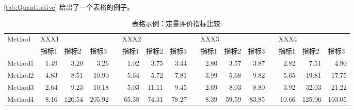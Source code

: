 \documentclass[a4paper,zihao=-4]{article}
\begin{document}
\cref{tab:Quantitative} 给出了一个表格的例子。

\begin{table}[htb!]
	\centering
	\setlength{\tabcolsep}{2pt}
	\scriptsize
	\caption{表格示例：定量评价指标比较.}
	\begin{tabular}{lrrrrrrrrrrrrrrr}
		\toprule
		Method & \multicolumn{3}{l}{XXX1} & & \multicolumn{3}{l}{XXX2} & & \multicolumn{3}{l}{XXX3} & & \multicolumn{3}{l}{XXX4} \\
		\cmidrule{2-4} \cmidrule{6-8} \cmidrule{10-12} \cmidrule{14-16}
		        & \multicolumn{1}{l}{指标1} & \multicolumn{1}{l}{指标2} & \multicolumn{1}{l}{指标3} &           & \multicolumn{1}{l}{指标1} & \multicolumn{1}{l}{指标2} & \multicolumn{1}{l}{指标3} &           & \multicolumn{1}{l}{指标1} & \multicolumn{1}{l}{指标2} & \multicolumn{1}{l}{指标3} &           & \multicolumn{1}{l}{指标1} & \multicolumn{1}{l}{指标2} & \multicolumn{1}{l}{指标3} \\
		\midrule
		Method1 & 1.49                        & 3.20                        & 3.26                        &           & 1.02                        & 3.75                        & 3.44                        &           & 2.80                        & 3.57                        & 3.87                        &           & 2.82                        & 7.51                        & 4.90                        \\
		Method2 & 4.83                        & 8.51                        & 10.90                       &           & 5.64                        & 5.72                        & 7.81                        &           & 3.99                        & 5.68                        & 9.82                        &           & 5.65                        & 19.81                       & 17.75                       \\
		Method3 & 2.64                        & 9.23                        & 10.18                       &           & 5.03                        & 11.11                       & 9.45                        &           & 2.69                        & 8.03                        & 8.80                        &           & 3.92                        & 32.03                       & 21.22                       \\
		Method4 & 8.16                        & 120.54                      & 205.92                      &           & 65.38                       & 74.31                       & 78.27                       &           & 8.39                        & 59.59                       & 83.85                       &           & 10.66                       & 125.06                      & 103.05                      \\

\end{tabular}
\end{table}
\end{document}
